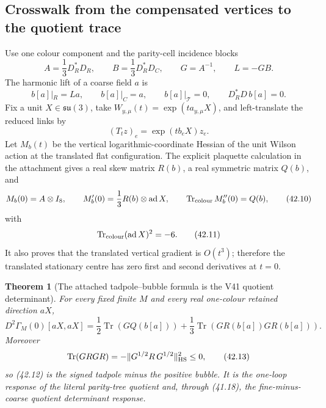 \documentclass[11pt,oneside]{book}
\newtheorem{theorem}{Theorem}[chapter]
\theoremstyle{definition}
\theoremstyle{remark}
\newcommand{\Tr}{\operatorname{Tr}}
\begin{document}
\subsection{Crosswalk from the compensated vertices to the quotient trace}

Use one colour component and the parity-cell incidence blocks
\[
 A=\frac13D_R^*D_R,\qquad
 B=\frac13D_R^*D_C,\qquad
 G=A^{-1},\qquad L=-GB.                                        \tag{42.7}
\]
The harmonic lift of a coarse field \(a\) is
\[
 b[a]|_R=La,\qquad b[a]|_C=a,\qquad b[a]|_{\mathscr T}=0,
 \qquad D_R^*D\,b[a]=0.                                        \tag{42.8}
\]
Fix a unit \(X\in\mathfrak{su}(3)\), take
\(W_{y,\mu}(t)=\exp(ta_{y,\mu}X)\), and left-translate the reduced
links by
\[
 (T_tz)_e=\exp(tb_eX)z_e.                                      \tag{42.9}
\]
Let \(M_b(t)\) be the vertical logarithmic-coordinate Hessian of the
unit Wilson action at the translated flat configuration.  The
explicit plaquette calculation in the attachment gives a real skew
matrix \(R(b)\), a real symmetric matrix \(Q(b)\), and
\[
 M_b(0)=A\otimes I_8,\qquad
 M_b'(0)=\frac13R(b)\otimes\operatorname{ad}X,\qquad
 \Tr_{\rm colour}M_b''(0)=Q(b),                                \tag{42.10}
\]
with
\[
 \Tr_{\rm colour}(\operatorname{ad}X)^2=-6.                    \tag{42.11}
\]
It also proves that the translated vertical gradient is \(O(t^3)\);
therefore the translated stationary centre has zero first and
second derivatives at \(t=0\).

\begin{theorem}[The attached tadpole--bubble formula is the V41
quotient determinant]
\label{thm:e8v42-trace-crosswalk}
For every fixed finite \(M\) and every real one-colour retained
direction \(aX\),
\[
 \boxed{
 D^2\Gamma_M(0)[aX,aX]
 =\frac12\Tr(GQ(b[a]))
  +\frac13\Tr(GR(b[a])GR(b[a])).}                              \tag{42.12}
\]
Moreover
\[
 \Tr(GRGR)
 =-\|G^{1/2}R\,G^{1/2}\|_{\rm HS}^2\le0,                       \tag{42.13}
\]
so (42.12) is the signed tadpole minus the positive bubble.  It is
the one-loop response of the literal parity-tree quotient and,
through (41.18), the fine-minus-coarse quotient determinant response.
\end{theorem}
\end{document}
